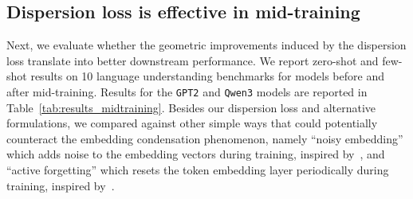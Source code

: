 \documentclass{article}
\theoremstyle{plain}
\theoremstyle{definition}
\theoremstyle{remark}
\begin{document}
\begin{table}[!tb]
\caption{Effect of hyperparameters on the dispersion loss. Ablation experiments are performed under the \texttt{GPT2} mid-training setting.}
\vspace{-4pt}
\centering
\setlength{\tabcolsep}{2pt}
\label{tab:ablation_midtraining_GPT2}
\vspace{-8pt}
\end{table}


\vspace{-4pt}
\subsection{Dispersion loss is effective in mid-training}
\label{sec:mid_training}

Next, we evaluate whether the geometric improvements induced by the dispersion loss translate into better downstream performance. We report zero-shot and few-shot results on 10 language understanding benchmarks for models before and after mid-training. Results for the \texttt{GPT2} and \texttt{Qwen3} models are reported in Table~\ref{tab:results_midtraining}. Besides our dispersion loss and alternative formulations, we compared against other simple ways that could potentially counteract the embedding condensation phenomenon, namely ``noisy embedding'' which adds noise to the embedding vectors during training, inspired by~\cite{jain2024neftune}, and ``active forgetting'' which resets the token embedding layer periodically during training, inspired by~\cite{active_forgetting}.
\end{document}
